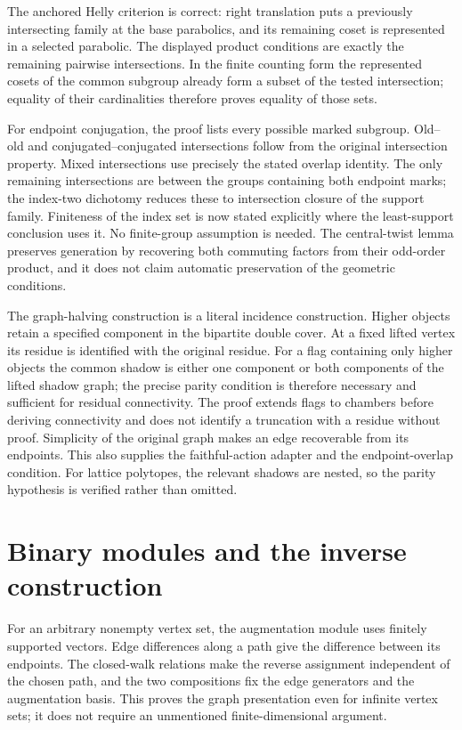 \documentclass[11pt]{article}
\begin{document}
The anchored Helly criterion is correct: right translation puts a previously
intersecting family at the base parabolics, and its remaining coset is represented
in a selected parabolic. The displayed product conditions are exactly the
remaining pairwise intersections. In the finite counting form the represented
cosets of the common subgroup already form a subset of the tested intersection;
equality of their cardinalities therefore proves equality of those sets.

For endpoint conjugation, the proof lists every possible marked subgroup.
Old--old and conjugated--conjugated intersections follow from the original
intersection property. Mixed intersections use precisely the stated overlap
identity. The only remaining intersections are between the groups containing
both endpoint marks; the index-two dichotomy reduces these to intersection
closure of the support family. Finiteness of the index set is now stated
explicitly where the least-support conclusion uses it. No finite-group
assumption is needed. The central-twist lemma preserves generation by recovering
both commuting factors from their odd-order product, and it does not claim
automatic preservation of the geometric conditions.

The graph-halving construction is a literal incidence construction. Higher
objects retain a specified component in the bipartite double cover. At a fixed
lifted vertex its residue is identified with the original residue. For a flag
containing only higher objects the common shadow is either one component or
both components of the lifted shadow graph; the precise parity condition is
therefore necessary and sufficient for residual connectivity. The proof extends
flags to chambers before deriving connectivity and does not identify a
truncation with a residue without proof. Simplicity of the original graph makes
an edge recoverable from its endpoints. This also supplies the faithful-action
adapter and the endpoint-overlap condition. For lattice polytopes, the relevant
shadows are nested, so the parity hypothesis is verified rather than omitted.

\section{Binary modules and the inverse construction}

For an arbitrary nonempty vertex set, the augmentation module uses finitely
supported vectors. Edge differences along a path give the difference between
its endpoints. The closed-walk relations make the reverse assignment independent
of the chosen path, and the two compositions fix the edge generators and the
augmentation basis. This proves the graph presentation even for infinite vertex
sets; it does not require an unmentioned finite-dimensional argument.
\end{document}
